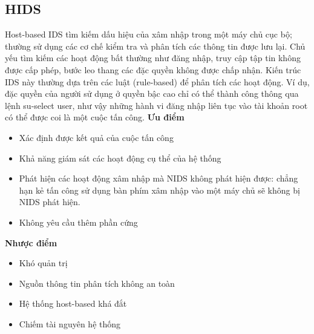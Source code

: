\subsection{HIDS}
Host-based IDS tìm kiếm dấu hiệu của xâm nhập trong một máy chủ cục bộ; thường sử dụng các cơ chế kiểm tra và phân tích các thông tin được lưu lại. 
Chủ yếu tìm kiếm các hoạt động bất thường như đăng nhập, truy cập tập tin không được cấp phép, bước leo thang các đặc quyền không được chấp nhận. 
Kiến trúc IDS này thường dựa trên các luật (rule-based) để phân tích các hoạt động. 
Ví dụ, đặc quyền của người sử dụng ở quyền bậc cao chỉ có thể thành công thông qua lệnh su-select user, như vậy những hành vi đăng nhập liên tục vào tài khoản root có thể được coi là một cuộc tấn công.
\newline
\newline
\textbf{Ưu điểm}
\begin{itemize}
    \item Xác định được kết quả của cuộc tấn công
    \item Khả năng giám sát các hoạt động cụ thể của hệ thống
    \item Phát hiện các hoạt động xâm nhập mà NIDS không phát hiện được: chẳng hạn kẻ tấn công sử dụng bàn phím xâm nhập vào một máy chủ sẽ không bị NIDS phát hiện.
    \item Không yêu cầu thêm phần cứng
\end{itemize}
\textbf{Nhược điểm}
\begin{itemize}
    \item Khó quản trị
    \item Nguồn thông tin phân tích không an toàn
    \item Hệ thống host-based khá đắt
    \item Chiếm tài nguyên hệ thống
\end{itemize}

